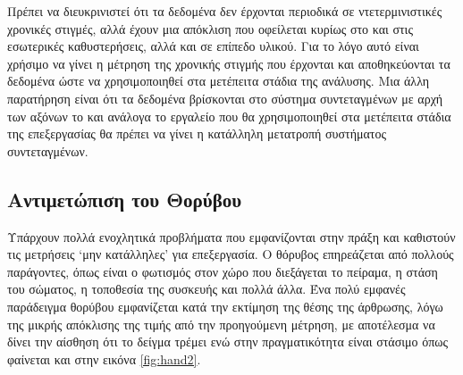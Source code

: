Πρέπει να διευκρινιστεί ότι τα δεδομένα δεν έρχονται περιοδικά σε ντετερμινιστικές χρονικές στιγμές, αλλά έχουν μια απόκλιση που οφείλεται κυρίως στο  και στις εσωτερικές καθυστερήσεις, αλλά και σε επίπεδο υλικού. Για το λόγο αυτό είναι χρήσιμο να γίνει η μέτρηση της χρονικής στιγμής που έρχονται και αποθηκεύονται τα δεδομένα ώστε να χρησιμοποιηθεί στα μετέπειτα στάδια της ανάλυσης. Μια άλλη παρατήρηση είναι ότι τα δεδομένα βρίσκονται στο σύστημα συντεταγμένων με αρχή των αξόνων το  και ανάλογα το εργαλείο που θα χρησιμοποιηθεί στα μετέπειτα στάδια της επεξεργασίας θα πρέπει να γίνει η κατάλληλη μετατροπή συστήματος συντεταγμένων.

\subsection{Αντιμετώπιση του Θορύβου}

Υπάρχουν πολλά ενοχλητικά προβλήματα που εμφανίζονται στην πράξη και καθιστούν τις μετρήσεις \lq μην κατάλληλες\rq\: για επεξεργασία. Ο θόρυβος επηρεάζεται από πολλούς παράγοντες, όπως είναι ο φωτισμός στον χώρο που διεξάγεται το πείραμα, η στάση του σώματος, η τοποθεσία της συσκευής και πολλά άλλα. Ένα πολύ εμφανές παράδειγμα θορύβου εμφανίζεται κατά την εκτίμηση της θέσης της άρθρωσης, λόγω της μικρής απόκλισης της τιμής από την προηγούμενη μέτρηση, με αποτέλεσμα να δίνει την αίσθηση ότι το δείγμα τρέμει ενώ στην πραγματικότητα είναι στάσιμο όπως φαίνεται και στην εικόνα \ref{fig:hand2}.

